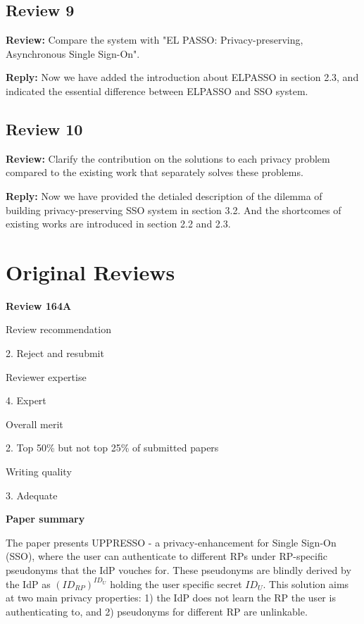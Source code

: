 \documentclass[letterpaper,onecolumn,10pt]{article}
\begin{document}
\subsection*{Review 9}
\vspace{1mm}\noindent\textbf{Review:}
Compare the system with "EL PASSO: Privacy-preserving, Asynchronous Single Sign-On".

\vspace{1mm}\noindent\textbf{Reply:}
Now we have added the introduction about ELPASSO in section 2.3, and indicated the essential difference between ELPASSO and SSO system.  


\subsection*{Review 10}
\vspace{1mm}\noindent\textbf{Review:}
Clarify the contribution on the solutions to each privacy problem compared to the existing work that separately solves these problems.

\vspace{1mm}\noindent\textbf{Reply:}
Now we have provided the detialed description of the dilemma of building privacy-preserving SSO system in section 3.2. And the shortcomes of existing works are introduced in section 2.2 and 2.3.  


\newpage
\section*{Original Reviews}

\vspace{1mm}\noindent\textbf{Review 164A}


Review recommendation


2. Reject and resubmit

Reviewer expertise


4. Expert

Overall merit


2. Top 50\% but not top 25\% of submitted papers

Writing quality


3. Adequate

\vspace{1mm}\noindent\textbf{Paper summary}


The paper presents UPPRESSO - a privacy-enhancement for Single Sign-On (SSO), where the user can authenticate to different RPs under RP-specific pseudonyms that the IdP vouches for. These pseudonyms are blindly derived by the IdP as $(ID_{RP})^{ID_U}$ holding the user specific secret $ID_U$. This solution aims at two main privacy properties: 1) the IdP does not learn the RP the user is authenticating to, and 2) pseudonyms for different RP are unlinkable.
\end{document}

